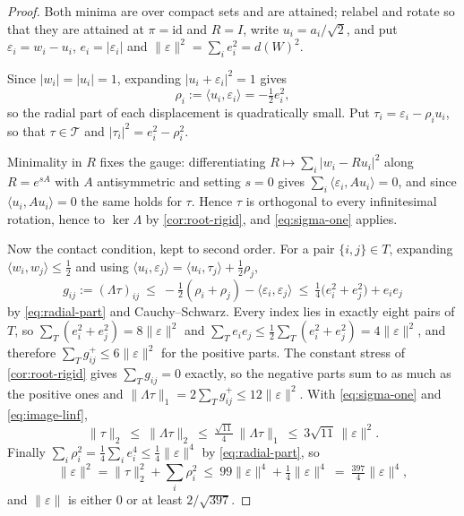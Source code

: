 \documentclass[11pt,reqno]{amsart}
\renewcommand{\_}{\origunderscore\allowbreak}
\numberwithin{equation}{section}
\theoremstyle{plain}
\theoremstyle{definition}
\theoremstyle{remark}
\begin{document}
\begin{proof}
Both minima are over compact sets and are attained; relabel and rotate
so that they are attained at $\pi=\mathrm{id}$ and $R=I$, write
$u_i=a_i/\sqrt2$, and put $\varepsilon_i=w_i-u_i$, $e_i=|\varepsilon_i|$
and $\|\varepsilon\|^2=\sum_ie_i^2=d(W)^2$.

Since $|w_i|=|u_i|=1$, expanding $|u_i+\varepsilon_i|^2=1$ gives
\begin{equation}\label{eq:radial-part}
  \rho_i:=\langle u_i,\varepsilon_i\rangle=-\tfrac12e_i^2 ,
\end{equation}
so the radial part of each displacement is quadratically small. Put
$\tau_i=\varepsilon_i-\rho_iu_i$, so that $\tau\in\mathcal{T}$ and
$|\tau_i|^2=e_i^2-\rho_i^2$.

Minimality in $R$ fixes the gauge: differentiating
$R\mapsto\sum_i|w_i-Ru_i|^2$ along $R=e^{sA}$ with $A$ antisymmetric and
setting $s=0$ gives $\sum_i\langle\varepsilon_i,Au_i\rangle=0$, and since
$\langle u_i,Au_i\rangle=0$ the same holds for $\tau$. Hence $\tau$ is
orthogonal to every infinitesimal rotation, hence to $\ker\Lambda$ by
\cref{cor:root-rigid}, and \eqref{eq:sigma-one} applies.

Now the contact condition, kept to second order. For a pair
$\{i,j\}\in T$, expanding $\langle w_i,w_j\rangle\le\tfrac12$ and
using $\langle u_i,\varepsilon_j\rangle=\langle u_i,\tau_j\rangle+\tfrac12\rho_j$,
\[
  g_{ij}:=(\Lambda\tau)_{ij}
  \ \le\ -\tfrac12(\rho_i+\rho_j)-\langle\varepsilon_i,\varepsilon_j\rangle
  \ \le\ \tfrac14\bigl(e_i^2+e_j^2\bigr)+e_ie_j
\]
by \eqref{eq:radial-part} and Cauchy--Schwarz. Every index lies in exactly
eight pairs of $T$, so
$\sum_{T}(e_i^2+e_j^2)=8\|\varepsilon\|^2$ and
$\sum_{T}e_ie_j\le\tfrac12\sum_{T}(e_i^2+e_j^2)=4\|\varepsilon\|^2$,
and therefore $\sum_{T}g_{ij}^{+}\le6\|\varepsilon\|^2$ for the
positive parts. The constant stress of \cref{cor:root-rigid} gives
$\sum_{T}g_{ij}=0$ exactly, so the negative parts sum to as much
as the positive ones and $\|\Lambda\tau\|_1=2\sum_{T}g_{ij}^{+}\le12\|\varepsilon\|^2$.
With \eqref{eq:sigma-one} and \eqref{eq:image-linf},
\[
  \|\tau\|_2\ \le\ \|\Lambda\tau\|_2
  \ \le\ \tfrac{\sqrt{11}}{4}\,\|\Lambda\tau\|_1
  \ \le\ 3\sqrt{11}\,\|\varepsilon\|^2 .
\]
Finally $\sum_i\rho_i^2=\tfrac14\sum_ie_i^4\le\tfrac14\|\varepsilon\|^4$
by \eqref{eq:radial-part}, so
\[
  \|\varepsilon\|^2=\|\tau\|_2^2+\sum_i\rho_i^2
  \ \le\ 99\|\varepsilon\|^4+\tfrac14\|\varepsilon\|^4
  \ =\ \tfrac{397}4\|\varepsilon\|^4 ,
\]
and $\|\varepsilon\|$ is either $0$ or at least $2/\sqrt{397}$.
\end{proof}
\end{document}

